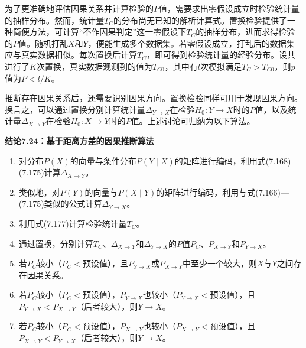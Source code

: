 为了更准确地评估因果关系并计算检验的$P$值，需要求出零假设成立时检验统计量的抽样分布。然而，统计量$T_C$的分布尚无已知的解析计算式。置换检验提供了一种简便方法，可计算“不作因果判定”这一零假设下$T_C$的抽样分布，进而求得检验的$P$值。随机打乱$X$和$Y$，便能生成多个数据集。若零假设成立，打乱后的数据集应与真实数据相似。每次置换后计算$T_C$，即可得到检验统计量的经验分布。设共进行了$K$次置换，真实数据观测到的值为$T_{C0}$，其中有$l$次模拟满足$T_C>T_{C0}$，则$p$值为$P<l/K$。

推断存在因果关系后，还需要识别因果方向。置换检验同样可用于发现因果方向。换言之，可以通过置换分别计算统计量$\Delta_{Y\to X}$在检验$H_0:Y\to X$时的$P$值，以及统计量$\Delta_{X\to Y}$在检验$H_0:X\to Y$时的$P$值。上述讨论可归纳为以下算法。

\par\medskip{}\noindent\textbf{结论7.24：基于距离方差的因果推断算法}\par
\begin{enumerate}
\item 对分布$P(X)$的向量与条件分布$P(Y\mid X)$的矩阵进行编码，利用式(7.168)—(7.175)计算$\Delta_{X\to Y}$。
\item 类似地，对$P(Y)$的向量与$P(X\mid Y)$的矩阵进行编码，利用与式(7.166)—(7.175)类似的公式计算$\Delta_{Y\to X}$。
\item 利用式(7.177)计算检验统计量$T_C$。
\item 通过置换，分别计算$T_C$、$\Delta_{X\to Y}$和$\Delta_{Y\to X}$的$P$值$P_C$、$P_{X\to Y}$和$P_{Y\to X}$。
\item 若$P_C$较小（$P_C<$预设值），且$P_{Y\to X}$或$P_{X\to Y}$中至少一个较大，则$X$与$Y$之间存在因果关系。
\item 若$P_C$较小（$P_C<$预设值），$P_{Y\to X}$也较小（$P_{Y\to X}<$预设值），且$P_{Y\to X}<P_{X\to Y}$（后者较大），则$Y\to X$。
\item 若$P_C$较小（$P_C<$预设值），$P_{X\to Y}$也较小（$P_{X\to Y}<$预设值），且$P_{X\to Y}<P_{Y\to X}$（后者较大），则$Y\to X$。
\end{enumerate}


